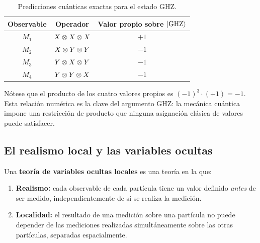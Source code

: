 \documentclass[]{unirTema}
\begin{document}
\begin{table}[H]
  \centering
  \renewcommand{\arraystretch}{1.5}
  \begin{tabular}{ccc}
    \hline
    \textbf{Observable} & \textbf{Operador}     & \textbf{Valor propio sobre} $\ket{\text{GHZ}}$ \\
    \hline
    $M_1$               & $X\otimes X\otimes X$ & $+1$                                           \\
    $M_2$               & $X\otimes Y\otimes Y$ & $-1$                                           \\
    $M_3$               & $Y\otimes X\otimes Y$ & $-1$                                           \\
    $M_4$               & $Y\otimes Y\otimes X$ & $-1$                                           \\
    \hline
  \end{tabular}
  \caption{Predicciones cuánticas exactas para el estado GHZ.}
\end{table}

\begin{info}
  Nótese que el producto de los cuatro valores propios es $(-1)^3 \cdot (+1) = -1$. Esta relación numérica es la clave del argumento GHZ: la mecánica cuántica impone una restricción de producto que ninguna asignación clásica de valores puede satisfacer.
\end{info}

\subsection{El realismo local y las variables ocultas}

\begin{defi}
  Una \textbf{teoría de variables ocultas locales} es una teoría en la que:
  \begin{enumerate}
    \item[\likeitem{VH1}] \textbf{Realismo:} cada observable de cada partícula tiene un valor definido \textit{antes} de ser medido, independientemente de si se realiza la medición.
    \item[\likeitem{VH2}] \textbf{Localidad:} el resultado de una medición sobre una partícula no puede depender de las mediciones realizadas simultáneamente sobre las otras partículas, separadas espacialmente.
  \end{enumerate}
\end{defi}
\end{document}

